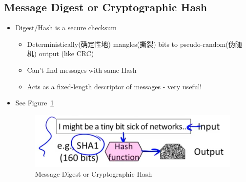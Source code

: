\documentclass[12pt]{ctexart}   %
\begin{document}
	\subsection{Message Digest or Cryptographic Hash}
	\begin{itemize}
		\item Digest/Hash is a secure checksum
		\begin{itemize}
			\item Deterministically(确定性地) mangles(撕裂) bits to pseudo-random(伪随机) output (like CRC)
			\item Can't find messages with same Hash
			\item Acts as a fixed-length descriptor of messages - very useful!
		\end{itemize}
		\item See Figure~\ref{fig:10-3-7}
		  
		\begin{figure}[h!] %
		\centering
		\includegraphics[scale=0.7]{images/10-3-7}
		\caption{Message Digest or Cryptographic Hash}
		\label{fig:10-3-7}
		\end{figure}
	\end{itemize}
\end{document}
